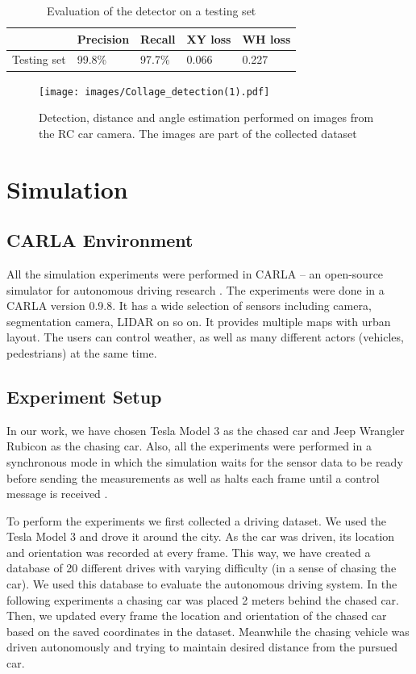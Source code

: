 \begin{table}[]
\begin{tabular}{l|llll}
\hline
            & Precision & Recall & XY loss & WH loss \\ \hline
Testing set & 99.8\%    & 97.7\% & 0.066   & 0.227   \\ \hline
\end{tabular}
\label{tab:detection}
\caption{Evaluation of the detector on a testing set}
\end{table}



\begin{figure}[h!]
    \centering
    \texttt{[image: images/Collage\_detection(1).pdf]}
    
    \caption{Detection, distance and angle estimation performed on images from the RC car camera. The images are part of the collected dataset}\label{f:detection_images}
\end{figure}

\section{Simulation}
\subsection{CARLA Environment}
All the simulation experiments were performed in CARLA -- an open-source simulator for autonomous driving research \cite{CARLA}. The experiments were done in a CARLA version 0.9.8. It has a wide selection of sensors including camera, segmentation camera, LIDAR on so on. It provides multiple maps with urban layout. The users can control weather, as well as many different actors (vehicles, pedestrians) at the same time. \par




\subsection{Experiment Setup}
In our work, we have chosen Tesla Model 3 as the chased car and Jeep Wrangler Rubicon as the chasing car. Also, all the experiments were performed in a synchronous mode in which the simulation waits for the sensor data to be ready before sending the measurements as well as halts each frame until a control message is received \cite{CARLA}. \par

To perform the experiments we first collected a driving dataset. We used the Tesla Model 3 and drove it around the city. As the car was driven, its location and orientation was recorded at every frame. This way, we have created a database of 20 different drives with varying difficulty (in a sense of chasing the car). We used this database to evaluate the autonomous driving system. In the following experiments a chasing car was placed 2 meters behind the chased car. Then, we updated every frame the location and orientation of the chased car based on the saved coordinates in the dataset. Meanwhile the chasing vehicle was driven autonomously and trying to maintain desired distance from the pursued car. 




